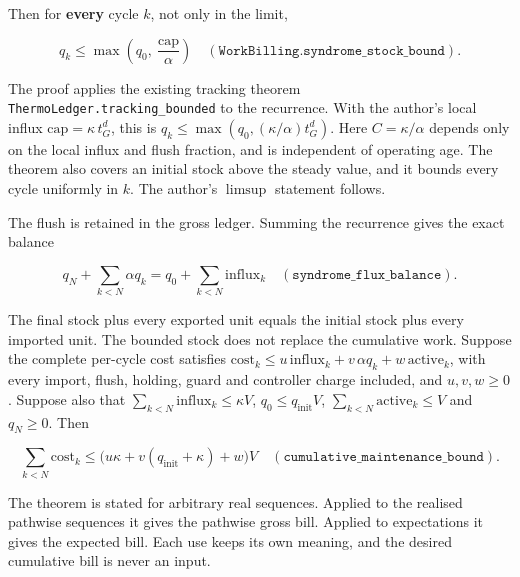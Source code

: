 \documentclass[
]{article}
\begin{document}
Then for \textbf{every} cycle \(k\), not only in the limit,

\[
q_k\le\max\!\left(q_0,\ \frac{\mathrm{cap}}{\alpha}\right)
\quad(\texttt{WorkBilling.syndrome\_stock\_bound}).
\]

The proof applies the existing tracking theorem
\texttt{T\allowbreak{}h\allowbreak{}e\allowbreak{}r\allowbreak{}m\allowbreak{}o\allowbreak{}L\allowbreak{}e\allowbreak{}d\allowbreak{}g\allowbreak{}e\allowbreak{}r\allowbreak{}.\allowbreak{}t\allowbreak{}r\allowbreak{}a\allowbreak{}c\allowbreak{}k\allowbreak{}i\allowbreak{}n\allowbreak{}g\allowbreak{}\_\allowbreak{}b\allowbreak{}o\allowbreak{}u\allowbreak{}n\allowbreak{}d\allowbreak{}e\allowbreak{}d}
to the recurrence. With the author's local influx
\(\mathrm{cap}=\kappa\,t_G^{d}\), this is
\(q_k\le\max(q_0,(\kappa/\alpha)t_G^{d})\). Here \(C=\kappa/\alpha\)
depends only on the local influx and flush fraction, and is independent
of operating age. The theorem also covers an initial stock above the
steady value, and it bounds every cycle uniformly in \(k\). The author's
\(\limsup\) statement follows.

The flush is retained in the gross ledger. Summing the recurrence gives
the exact balance

\[
q_N+\sum_{k<N}\alpha q_k=q_0+\sum_{k<N}\mathrm{influx}_k
\quad(\texttt{syndrome\_flux\_balance}).
\]

The final stock plus every exported unit equals the initial stock plus
every imported unit. The bounded stock does not replace the cumulative
work. Suppose the complete per-cycle cost satisfies
\(\mathrm{cost}_k\le u\,\mathrm{influx}_k+v\,\alpha q_k+w\,\mathrm{active}_k\),
with every import, flush, holding, guard and controller charge included,
and \(u,v,w\ge0\). Suppose also that
\(\sum_{k<N}\mathrm{influx}_k\le\kappa V\),
\(q_0\le q_{\mathrm{init}}V\), \(\sum_{k<N}\mathrm{active}_k\le V\) and
\(q_N\ge0\). Then

\[
\sum_{k<N}\mathrm{cost}_k\le\bigl(u\kappa+v(q_{\mathrm{init}}+\kappa)+w\bigr)V
\quad(\texttt{cumulative\_maintenance\_bound}).
\]

The theorem is stated for arbitrary real sequences. Applied to the
realised pathwise sequences it gives the pathwise gross bill. Applied to
expectations it gives the expected bill. Each use keeps its own meaning,
and the desired cumulative bill is never an input.
\end{document}
